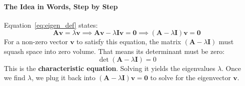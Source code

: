 \paragraph{The Idea in Words, Step by Step}
Equation~\ref{eq:eigen_def} states:
\begin{equation*}
\mathbf{A}\mathbf{v} = \lambda \mathbf{v} \implies \mathbf{A}\mathbf{v} - \lambda \mathbf{I}\mathbf{v} = \mathbf{0} \implies (\mathbf{A} - \lambda \mathbf{I})\mathbf{v} = \mathbf{0}
\end{equation*}
For a non-zero vector $\mathbf{v}$ to satisfy this equation, the matrix $(\mathbf{A} - \lambda \mathbf{I})$ must squash space into zero volume. That means its determinant must be zero:
\begin{equation}
\det(\mathbf{A} - \lambda \mathbf{I}) = 0\label{eq:char_eq}
\end{equation}
This is the \textbf{characteristic equation}. Solving it yields the eigenvalues $\lambda$. Once we find $\lambda$, we plug it back into $(\mathbf{A} - \lambda \mathbf{I})\mathbf{v} = \mathbf{0}$ to solve for the eigenvector $\mathbf{v}$.

